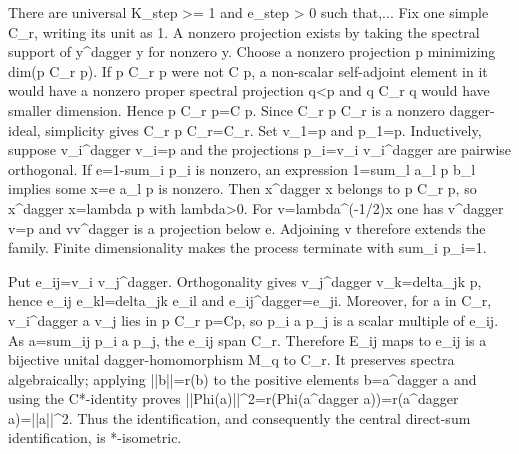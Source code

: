 \documentclass{article}
\begin{document}
\begin{proofbox}{There are universal K\_step >= 1 and e\_step > 0 such that,...}
Fix one simple C\_r, writing its unit as 1. A nonzero projection exists by taking the spectral support of y\textasciicircum{}dagger y for nonzero y. Choose a nonzero projection p minimizing dim(p C\_r p). If p C\_r p were not C p, a non-scalar self-adjoint element in it would have a nonzero proper spectral projection q<p and q C\_r q would have smaller dimension. Hence p C\_r p=C p. Since C\_r p C\_r is a nonzero dagger-ideal, simplicity gives C\_r p C\_r=C\_r. Set v\_1=p and p\_1=p. Inductively, suppose v\_i\textasciicircum{}dagger v\_i=p and the projections p\_i=v\_i v\_i\textasciicircum{}dagger are pairwise orthogonal. If e=1-sum\_i p\_i is nonzero, an expression 1=sum\_l a\_l p b\_l implies some x=e a\_l p is nonzero. Then x\textasciicircum{}dagger x belongs to p C\_r p, so x\textasciicircum{}dagger x=lambda p with lambda>0. For v=lambda\textasciicircum{}(-1/2)x one has v\textasciicircum{}dagger v=p and vv\textasciicircum{}dagger is a projection below e. Adjoining v therefore extends the family. Finite dimensionality makes the process terminate with sum\_i p\_i=1.

Put e\_ij=v\_i v\_j\textasciicircum{}dagger. Orthogonality gives v\_j\textasciicircum{}dagger v\_k=delta\_jk p, hence e\_ij e\_kl=delta\_jk e\_il and e\_ij\textasciicircum{}dagger=e\_ji. Moreover, for a in C\_r, v\_i\textasciicircum{}dagger a v\_j lies in p C\_r p=Cp, so p\_i a p\_j is a scalar multiple of e\_ij. As a=sum\_ij p\_i a p\_j, the e\_ij span C\_r. Therefore E\_ij maps to e\_ij is a bijective unital dagger-homomorphism M\_q to C\_r. It preserves spectra algebraically; applying ||b||=r(b) to the positive elements b=a\textasciicircum{}dagger a and using the C*-identity proves ||Phi(a)||\textasciicircum{}2=r(Phi(a\textasciicircum{}dagger a))=r(a\textasciicircum{}dagger a)=||a||\textasciicircum{}2. Thus the identification, and consequently the central direct-sum identification, is *-isometric.


\end{proofbox}
\end{document}
